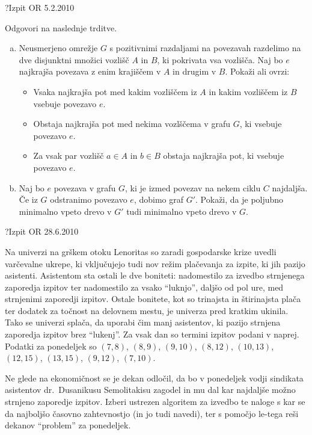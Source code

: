 \begin{naloga}{?}{Izpit OR 5.2.2010}
\begin{vprasanje}[trditve2]
Odgovori na naslednje trditve.
\begin{enumerate}[(a)]
\item Neusmerjeno omrežje $G$ s pozitivnimi razdaljami na povezavah
razdelimo na dve disjunktni množici vozlišč $A$ in $B$,
ki pokrivata vsa vozlišča.
Naj bo $e$ najkrajša povezava z enim krajiščem v $A$ in drugim v $B$.
Pokaži ali ovrzi:
    \begin{itemize}
    \item Vsaka najkrajša pot med kakim vozliščem iz $A$
    in kakim vozliščem iz $B$ vsebuje povezavo $e$.
    \item Obstaja najkrajša pot med nekima vozlščema v grafu $G$,
    ki vsebuje povezavo $e$.
    \item Za vsak par vozlišč $a \in A$ in $b \in B$ obstaja najkrajša pot,
    ki vsebuje povezavo $e$.
    \end{itemize}
\item Naj bo $e$ povezava v grafu $G$,
ki je izmed povezav na nekem ciklu $C$ najdaljša.
Če iz $G$ odstranimo povezavo $e$, dobimo graf $G'$.
Pokaži, da je poljubno minimalno vpeto drevo v $G'$
tudi minimalno vpeto drevo v $G$.
\end{enumerate}
\end{vprasanje}
\begin{odgovor}
\end{odgovor}
\end{naloga}


\begin{naloga}{?}{Izpit OR 28.6.2010}
\begin{vprasanje}[lenoritas]
Na univerzi na grškem otoku Lenoritas
so zaradi gospodarske krize uvedli varčevalne ukrepe,
ki vključujejo tudi nov režim plačevanja za izpite,
ki jih pazijo asistenti.
Asistentom sta ostali le dve boniteti:
nadomestilo za izvedbo strnjenega zaporedja izpitov
ter nadomestilo za vsako ``luknjo'', daljšo od pol ure,
med strnjenimi zaporedji izpitov.
Ostale bonitete,
kot so trinajsta in štirinajsta plača
ter dodatek za točnost na delovnem mestu,
je univerza pred kratkim ukinila.
Tako se univerzi splača, da uporabi čim manj asistentov,
ki pazijo strnjena zaporedja izpitov brez ``lukenj''.
Za vsak dan so termini izpitov podani v naprej.
Podatki za ponedeljek so $(7, 8)$, $(8, 9)$, $(9, 10)$, $(8, 12)$,
$(10, 13)$, $(12, 15)$, $(13, 15)$, $(9, 12)$, $(7, 10)$.

Ne glede na ekonomičnost se je dekan odločil,
da bo v ponedeljek vodji sindikata asistentov dr.~Dusanikusu Semolitakisu
zagodel in mu dal kar najdaljše možno strnjeno zaporedje izpitov.
Izberi ustrezen algoritem za izvedbo te naloge
s kar se da najboljšo časovno zahtevnostjo (in jo tudi navedi),
ter s pomočjo le-tega reši dekanov ``problem'' za ponedeljek.

\end{vprasanje}
\begin{odgovor}
\end{odgovor}
\end{naloga}


